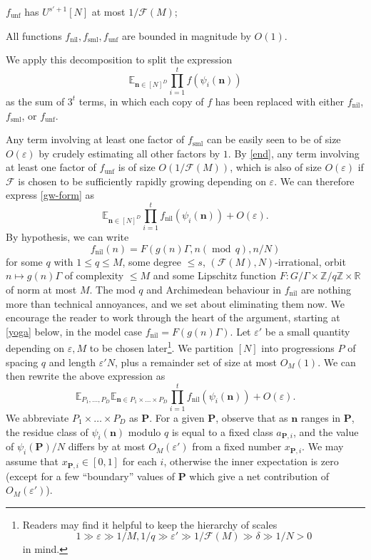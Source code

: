 \documentclass[11pt,reqno]{amsart}
\numberwithin{equation}{section}
\theoremstyle{plain}
\theoremstyle{definition}
\renewcommand{\leq}{\leqslant}
\newcommand{\md}[1]{\ensuremath{(\operatorname{mod}\, #1)}}
\newcommand\E{{\mathbb{E}}}
\newcommand\Z{\mathbb{Z}}
\newcommand\R{\mathbb{R}}
\newcommand\1{{\bf 1}}
\newcommand\2{{\bf 2}}
\newcommand\eps{\varepsilon}
\newcommand\nil{{\operatorname{nil}}}
\newcommand\sml{{\operatorname{sml}}}
\newcommand\unf{{\operatorname{unf}}}
\newcommand\Grow{{\mathcal F}}
\begin{document}
$f_\unf$ has $U^{s'+1}[N]$ at most $1/\Grow(M)$;

All functions $f_\nil, f_\sml, f_\unf$ are bounded in magnitude by $O(1)$.


We apply this decomposition to split the expression
\begin{equation}\label{gw-form}
 \E_{\mathbf{n} \in [N]^D} \prod_{i=1}^t f( \psi_i(\mathbf{n}) ) 
\end{equation}
as the sum of $3^t$ terms, in which each copy of $f$ has been replaced with either $f_\nil$, $f_\sml$, or $f_\unf$.

Any term involving at least one factor of $f_\sml$ can be easily seen to be of size $O(\eps)$ by crudely estimating all other factors by $1$.  By \eqref{end}, any term involving at least one factor of $f_\unf$ is of size $O(1/\Grow(M))$, which is also of size $O(\eps)$ if $\Grow$ is chosen to be sufficiently rapidly growing depending on $\eps$.  We can therefore express \eqref{gw-form} as
$$
 \E_{\mathbf{n}\in [N]^D} \prod_{i=1}^t f_\nil(\psi_i(\mathbf{n}) ) + O(\eps).
$$
By hypothesis, we can write
$$ f_\nil(n) = F( g(n) \Gamma, n \md{q}, n/N )$$
for some $q$ with $1 \leq q \leq M$, some degree $\leq s$, $(\Grow(M),N)$-irrational, orbit $n \mapsto g(n) \Gamma$ of complexity $\leq M$ and some Lipschitz function $F: G/\Gamma \times \Z/q\Z \times \R$ of norm at most $M$. The mod $q$ and Archimedean behaviour in $f_\nil$ are nothing more than technical annoyances, and we set about eliminating them now. We encourage the reader to work through the heart of the argument, starting at \eqref{yoga} below, in the model case $f_{\nil} = F(g(n)\Gamma)$.  Let $\eps'$ be a small quantity depending on $\eps, M$ to be chosen later\footnote{Readers may find it helpful to keep the hierarchy of scales 
$$ 1 \gg \eps \gg 1/M, 1/q \gg \eps' \gg 1/\Grow(M) \gg \delta \gg 1/N > 0$$
in mind.}.  We partition $[N]$ into progressions $P$ of spacing $q$ and length $\eps' N$, plus a remainder set of size at most $O_M(1)$.  We can then rewrite the above expression as
$$
 \E_{P_1,\ldots,P_D} \E_{\mathbf{n} \in P_1 \times \dots \times P_D}  \prod_{i=1}^t f_\nil( \psi_i(\mathbf{n}) ) + O(\eps).
$$
We abbreviate $P_1 \times \ldots \times P_D$ as ${\mathbf{P}}$.
For a given ${\mathbf{P}}$, observe that as $\mathbf{n}$ ranges in ${\mathbf{P}}$, the residue class of $\psi_i(\mathbf{n})$ modulo $q$ is equal to a fixed class $a_{{\mathbf{P}},i}$, and the value of $\psi_i({\mathbf{P}})/N$ differs by at most $O_M(\eps')$ from a fixed number $x_{{\mathbf{P}},i}$.  We may assume that $x_{{\mathbf{P}},i} \in [0,1]$ for each $i$, otherwise the inner expectation is zero (except for a few ``boundary'' values of ${\mathbf{P}}$ which give a net contribution of $O_M(\eps')$).
\end{document}
